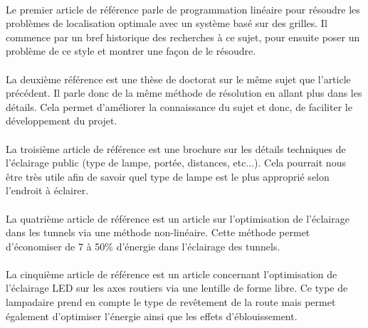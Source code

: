
\paragraph{}
Le premier article de r\'ef\'erence \cite{mainref} parle de programmation lin\'eaire pour r\'esoudre les problèmes de localisation optimale avec un syst\`eme bas\'e sur des grilles. Il commence par un bref historique des recherches \`a ce sujet, pour ensuite poser  un probl\`eme de ce style et montrer une fa\c{c}on de le r\'esoudre.



\paragraph{}
La deuxi\`eme r\'ef\'erence \cite{phdref} est une th\`ese de doctorat sur le m\^eme sujet que l'article pr\'ec\'edent. Il parle donc de la m\^eme m\'ethode de r\'esolution en allant plus dans les d\'etails. Cela permet d'am\'eliorer la connaissance du sujet et donc, de faciliter le d\'eveloppement du projet.

\paragraph{}
La troisi\`eme article de référence \cite{ascenref} est une brochure sur les détails techniques de l'éclairage public (type de lampe, portée, distances, etc...). Cela pourrait nous \^etre très utile afin de savoir quel type de lampe est le plus approprié selon l'endroit à éclairer.

\paragraph{}
La quatri\`eme article de référence \cite{tunnelref} est un article sur l'optimisation de l'éclairage dans les tunnels via une méthode non-linéaire. Cette méthode permet d'économiser de 7 à 50\% d'énergie dans l'éclairage des tunnels.

\paragraph{}
La cinqui\`eme article de référence \cite{ledref} est un article concernant l'optimisation de l'éclairage LED sur les axes routiers via une lentille de forme libre. Ce type de lampadaire prend en compte le type de revêtement de la route mais permet également d'optimiser l'énergie ainsi que les effets d'éblouissement.


